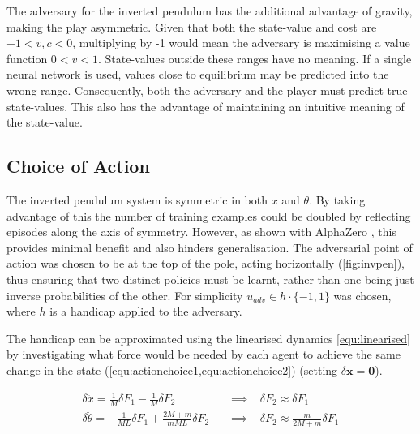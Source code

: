 \documentclass[../main.tex]{subfiles}
\begin{document}
The adversary for the inverted pendulum has the additional advantage of gravity, making the play asymmetric. Given that both the state-value and cost are $-1 < v, c < 0$, multiplying by -1 would mean the adversary is maximising a value function $0 < v < 1$. State-values outside these ranges have no meaning. If a single neural network is used, values close to equilibrium may be predicted into the wrong range. Consequently, both the adversary and the player must predict true state-values. This also has the advantage of maintaining an intuitive meaning of the state-value.

\subsection{Choice of Action}
\label{sec:choiceofaction}

The inverted pendulum system is symmetric in both $x$ and $\theta$. By taking advantage of this the number of training examples could be doubled by reflecting episodes along the axis of symmetry. However, as shown with AlphaZero \cite{AlphaZero}, this provides minimal benefit and also hinders generalisation. The adversarial point of action was chosen to be at the top of the pole, acting horizontally (\cref{fig:invpen}), thus ensuring that two distinct policies must be learnt, rather than one being just inverse probabilities of the other. For simplicity $u_{adv} \in h \cdot \{-1, 1\}$ was chosen, where $h$ is a handicap applied to the adversary.

The handicap can be approximated using the linearised dynamics \cref{equ:linearised} by investigating what force would be needed by each agent to achieve the same change in the state (\cref{equ:actionchoice1,equ:actionchoice2}) (setting $\delta \boldsymbol{x} = \boldsymbol{0}$).

\begin{subequations}
\begin{align}
   \delta \ddot{x} = \frac{1}{M}\delta F_1 - \frac{1}{M} \delta F_2 \hspace{10pt} &\implies \hspace{10pt} \delta F_2 \approx \delta F_1 \label{equ:actionchoice1} \\
   \delta \ddot{\theta} = -\frac{1}{ML} \delta F_1 + \frac{2M + m}{mML} \delta F_2 \hspace{10pt} &\implies \hspace{10pt} \delta F_2 \approx \frac{m}{2M + m} \delta F_1 \label{equ:actionchoice2}
\end{align}
\end{subequations}
\end{document}
